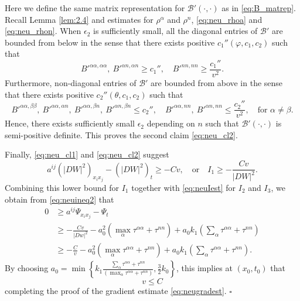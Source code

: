 \documentclass[12pt]{article}
\numberwithin{equation}{section}
\theoremstyle{plain}
\theoremstyle{definition}
\theoremstyle{remark}
\begin{document}
Here we define the same matrix representation for $\mathcal{B}'(\cdot,\cdot)$ as in \eqref{eq:B_matrep}. Recall Lemma \ref{lem:2.4} and estimates for $\rho^{\alpha}$ and $\rho^n$, \eqref{eq:neu_rhoa} and \eqref{eq:neu_rhon}. When $\epsilon_2$ is sufficiently small, all the diagonal entries of $\mathcal{B}'$ are bounded from below in the sense that there exists positive $c_1''(\varphi,c_1,c_2)$ such that
\begin{equation*}
    B'^{\alpha\alpha,\alpha\alpha}, \ B'^{\alpha n,\alpha n} \geq c_1'', \quad B'^{nn,nn} \geq \frac{c_1''}{v^2}.
\end{equation*}
Furthermore, non-diagonal entries of $\mathcal{B}'$ are bounded from above
in the sense that there exists positive $c_2''(\theta,c_1,c_2)$ such that
\begin{equation*}
    B'^{\alpha\alpha,\beta\beta}, \ B'^{\alpha \alpha, \alpha n} , \ B'^{\alpha \alpha,\beta n}, \  B'^{\alpha n,\beta n} \leq c_2'', \quad B'^{\alpha \alpha, n n} , \  B'^{\alpha n, n n} \leq \frac{c_2''}{v^2},\quad\text{for $\alpha\neq\beta$.}
\end{equation*}
Hence, there exists sufficiently small $\epsilon_2$ depending on $n$ such that $\mathcal{B}'(\cdot,\cdot)$ is semi-positive definite. This proves the
second claim \eqref{eq:neu_cl2}.

Finally, \eqref{eq:neu_cl1} and \eqref{eq:neu_cl2} suggest
\begin{equation*}
    a^{ij} \left(|DW|^2 \right)_{x_i x_j} - \left(|DW|^2 \right)_t \geq -C v,  
\quad
\text{or}
\quad
    I_1 \geq - \frac{C v }{|DW|^2} .
\end{equation*}
Combining this lower bound for $I_1$ together with \eqref{eq:neuIest} for $I_2$ and $I_3$, 
we obtain from \eqref{eq:neuineq2} that 
\begin{equation*}
\begin{split}
    0 & \geq a^{ij} \Psi_{x_i x_j} - \Psi_t \\
    & \geq - \frac{Cv }{|Dw|^2} - a_0^2 \left(\max_{\alpha} \tau^{\alpha \alpha} + \tau^{n n} \right) + a_0 k_1 \left(\sum_{\alpha} \tau^{\alpha \alpha} + \tau^{n n} \right) \\
    & \geq - \frac{C}{v} - a_0^2 \left(\max_{\alpha} \tau^{\alpha \alpha} + \tau^{n n} \right) + a_0 k_1 \left(\sum_{\alpha} \tau^{\alpha \alpha} + \tau^{n n} \right).
\end{split}
\end{equation*}
By choosing $a_0=\min \left\{ k_1 \frac{\sum_{\alpha} \tau^{\alpha \alpha} + \tau^{n n}}{\left(\max_{\alpha} \tau^{\alpha \alpha} + \tau^{n n} \right)},\frac{3}{2} k_0  \right\}$, this implies at $(x_0,t_0)$ that
\begin{equation*}
    v\leq C
\end{equation*}
completing the proof of the gradient estimate \eqref{eq:neugradest}.
\hfill$\square$\\
\end{document}
